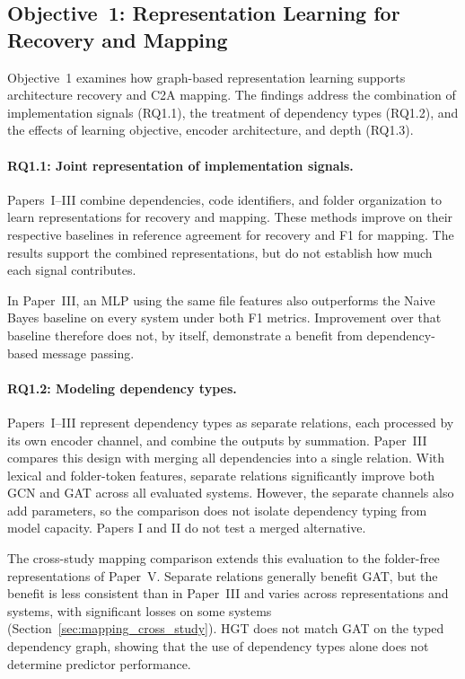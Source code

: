 \subsection{Objective~1: Representation Learning for Recovery and Mapping\label{sec:cont_1}}

Objective~1 examines how graph-based representation learning supports architecture recovery and C2A mapping. The findings address the combination of implementation signals (RQ1.1), the treatment of dependency types (RQ1.2), and the effects of learning objective, encoder architecture, and depth (RQ1.3).

\paragraph{RQ1.1: Joint representation of implementation signals.} Papers~I--III combine dependencies, code identifiers, and folder organization to learn representations for recovery and mapping. These methods improve on their respective baselines in reference agreement for recovery and F1 for mapping. The results support the combined representations, but do not establish how much each signal contributes.

In Paper~III, an MLP using the same file features also outperforms the Naive Bayes baseline on every system under both F1 metrics. Improvement over that baseline therefore does not, by itself, demonstrate a benefit from dependency-based message passing.

\paragraph{RQ1.2: Modeling dependency types.} Papers~I--III represent dependency types as separate relations, each processed by its own encoder channel, and combine the outputs by summation. Paper~III compares this design with merging all dependencies into a single relation. With lexical and folder-token features, separate relations significantly improve both GCN and GAT across all evaluated systems. However, the separate channels also add parameters, so the comparison does not isolate dependency typing from model capacity. Papers I and II do not test a merged alternative.

The cross-study mapping comparison extends this evaluation to the folder-free representations of Paper~V. Separate relations generally benefit GAT, but the benefit is less consistent than in Paper~III and varies across representations and systems, with significant losses on some systems (Section~\ref{sec:mapping_cross_study}). HGT does not match GAT on the typed dependency graph, showing that the use of dependency types alone does not determine predictor performance.

